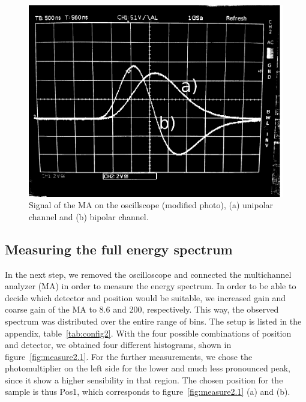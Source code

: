 \begin{figure}[htpb]
    \centering
    \includegraphics[width=0.8\linewidth]{figures/uni_bipolar2}
    \caption{Signal of the MA on the oscillscope (modified photo), 
        (a) unipolar channel and (b) bipolar channel.}
    \label{fig:uni_bipolar}
\end{figure}

\subsection{Measuring the full energy spectrum}
\label{ssub:Measuring the full energy spectrum}
In the next step, we removed the oscilloscope and connected the multichannel analyzer (MA)
in order to measure the energy spectrum. In order to be able to decide which detector and position would
be suitable, we increased gain and coarse gain of the MA to 8.6 and 200, respectively.
This way, the observed spectrum was distributed over the entire range of bins. 
The setup is listed in the appendix, table~\ref{tab:config2}. With the four possible combinations
of position and detector, we obtained four different histograms, shown in figure~\ref{fig:measure2.1}.
For the further measurements, we chose the photomultiplier on the left side for the lower and much less 
pronounced peak, since it show a higher sensibility in that region. The 
chosen position for the sample is thus Pos1, which corresponds to figure~\ref{fig:measure2.1} (a) and (b).

